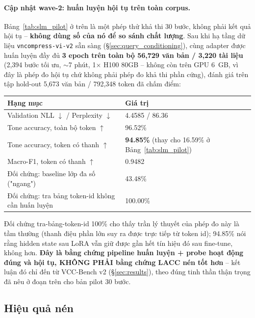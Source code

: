 \documentclass[12pt,a4paper]{article}
\newcommand{\method}[1]{\textsc{#1}}         %
\begin{document}
\paragraph{Cập nhật wave-2: huấn luyện hội tụ trên toàn corpus.} Bảng~\ref{tab:slm_pilot} ở trên là một phép thử khả thi 30 bước, không phải kết quả hội tụ -- \textbf{không dùng số của nó để so sánh chất lượng}. Sau khi hạ tầng dữ liệu \texttt{vncompress-vi-v2} sẵn sàng (\S\ref{sec:query_conditioning}), cùng adapter được huấn luyện đầy đủ \textbf{3 epoch trên toàn bộ 56,729 văn bản / 3,220 tài liệu} (2,394 bước tối ưu, $\sim$7 phút, 1$\times$ H100 80GB -- không còn trên GPU 6~GB, vì đây là phép đo hội tụ chứ không phải phép đo khả thi phần cứng), đánh giá trên tập hold-out 5,673 văn bản / 792,348 token đã chấm điểm:
\begin{center}
\begin{tabular}{ll}
\toprule
\textbf{Hạng mục} & \textbf{Giá trị} \\
\midrule
Validation NLL $\downarrow$ / Perplexity $\downarrow$ & 4.4585 / 86.36 \\
Tone accuracy, toàn bộ token $\uparrow$ & 96.52\% \\
Tone accuracy, token có thanh $\uparrow$ & \textbf{94.85\%} (thay cho 16.59\% ở Bảng~\ref{tab:slm_pilot}) \\
Macro-F1, token có thanh $\uparrow$ & 0.9482 \\
Đối chứng: baseline lớp đa số ("ngang") & 43.48\% \\
Đối chứng: tra bảng token-id không cần huấn luyện & 100.00\% \\
\bottomrule
\end{tabular}
\end{center}
Đối chứng tra-bảng-token-id 100\% cho thấy trần lý thuyết của phép đo này là tầm thường (thanh điệu phần lớn suy ra được trực tiếp từ token id); 94.85\% nói rằng hidden state sau LoRA vẫn giữ được gần hết tín hiệu đó sau fine-tune, không hơn. \textbf{Đây là bằng chứng pipeline huấn luyện + probe hoạt động đúng và hội tụ, KHÔNG PHẢI bằng chứng \method{LACC} nén tốt hơn} -- kết luận đó chỉ đến từ VCC-Bench v2 (\S\ref{sec:results}), theo đúng tinh thần thận trọng đã nêu ở đoạn trên cho bản pilot 30 bước.

\subsection{Hiệu quả nén}
\end{document}
